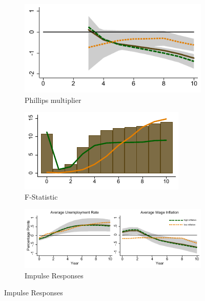 \documentclass[12pt]{article}
\begin{document}
\begin{figure}[h!]
    \centering
	\caption{State-Dependent Phillips multiplier and IRFs}
	\label{F2:Multiplier}
	\begin{subfigure}[b]{0.45\textwidth}
		\caption{Phillips multiplier}
		\label{F2:Multiplier_M}
		\includegraphics[width=\textwidth]{../Output/Figures/Figure_4a.pdf}	
	\end{subfigure}
	\begin{subfigure}[b]{0.45\textwidth}
		\caption{F-Statistic}
		\label{F2:Multiplier_F}
		\includegraphics[width=\textwidth]{../Output/Figures/Figure_4b.pdf}
	\end{subfigure}
	\begin{subfigure}[b]{0.9\textwidth}
		\caption{Impulse Responses}
		\label{F2:Dynamics}
		\includegraphics[width=\textwidth]{../Output/Figures/Figure_4c.pdf}

\end{subfigure}
\end{figure}
\end{document}

